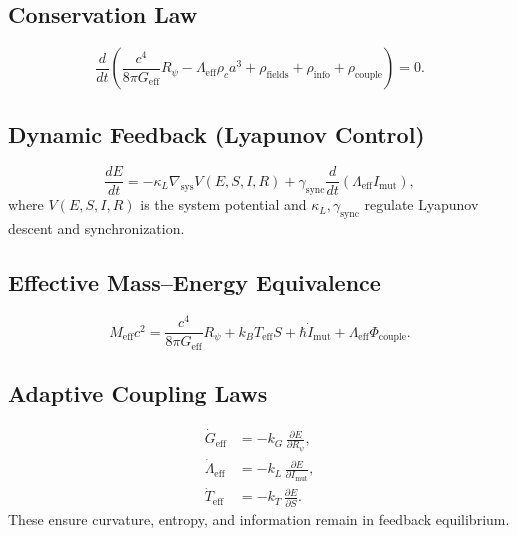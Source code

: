 \documentclass[12pt]{article}
\begin{document}
\subsection{Conservation Law}
\begin{equation}
\frac{d}{dt}\!\left(
\frac{c^4}{8\pi G_{\text{eff}}}R_{\psi}
-\Lambda_{\text{eff}}\rho_c a^3
+\rho_{\text{fields}}+\rho_{\text{info}}+\rho_{\text{couple}}
\right)=0 .
\end{equation}

\subsection{Dynamic Feedback (Lyapunov Control)}
\begin{equation}
\frac{dE}{dt}=-\kappa_L\nabla_{\text{sys}}V(E,S,I,R)
+\gamma_{\text{sync}}\frac{d}{dt}(\Lambda_{\text{eff}} I_{\text{mut}}),
\end{equation}
where \(V(E,S,I,R)\) is the system potential and
\(\kappa_L,\gamma_{\text{sync}}\) regulate Lyapunov descent and synchronization.

\subsection{Effective Mass--Energy Equivalence}
\begin{equation}
M_{\text{eff}}c^2=
\frac{c^4}{8\pi G_{\text{eff}}}R_{\psi}
+k_B T_{\text{eff}}S
+\hbar\dot{I}_{\text{mut}}
+\Lambda_{\text{eff}}\Phi_{\text{couple}} .
\end{equation}

\subsection{Adaptive Coupling Laws}
\begin{align}
\dot G_{\text{eff}} &= -k_G\,\frac{\partial E}{\partial R_{\psi}},\\
\dot \Lambda_{\text{eff}} &= -k_L\,\frac{\partial E}{\partial I_{\text{mut}}},\\
\dot T_{\text{eff}} &= -k_T\,\frac{\partial E}{\partial S}.
\end{align}
These ensure curvature, entropy, and information remain in feedback equilibrium.
\end{document}
